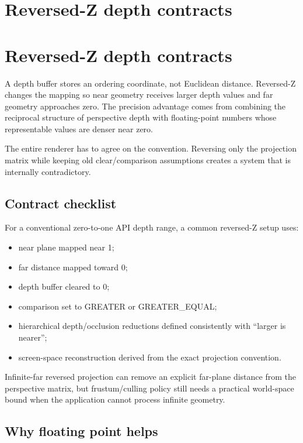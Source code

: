 \hypertarget{appendix-275ec8847057}{}
\section*{Reversed-Z depth contracts}
\section{Reversed-Z depth contracts}\label{reversed-z-depth-contracts}

A depth buffer stores an ordering coordinate, not Euclidean distance. Reversed-Z changes the mapping so near geometry receives larger depth values and far geometry approaches zero. The precision advantage comes from combining the reciprocal structure of perspective depth with floating-point numbers whose representable values are denser near zero.

The entire renderer has to agree on the convention. Reversing only the projection matrix while keeping old clear/comparison assumptions creates a system that is internally contradictory.

\subsection{Contract checklist}\label{contract-checklist}

For a conventional zero-to-one API depth range, a common reversed-Z setup uses:

\begin{itemize}
\tightlist
\item
  near plane mapped near 1;
\item
  far distance mapped toward 0;
\item
  depth buffer cleared to 0;
\item
  comparison set to GREATER or GREATER\_EQUAL;
\item
  hierarchical depth/occlusion reductions defined consistently with ``larger is nearer'';
\item
  screen-space reconstruction derived from the exact projection convention.
\end{itemize}

Infinite-far reversed projection can remove an explicit far-plane distance from the perspective matrix, but frustum/culling policy still needs a practical world-space bound when the application cannot process infinite geometry.

\subsection{Why floating point helps}\label{why-floating-point-helps}

